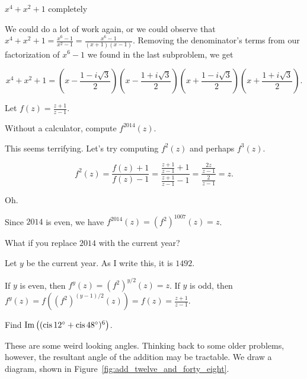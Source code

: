 \documentclass[../key.tex]{subfiles}
\begin{document}
\begin{inner_problem}
\item $x^4+x^2+1$ completely
\end{inner_problem}

We could do a lot of work again, or we could observe that $x^4+x^2+1 = \frac{x^6 - 1}{x^2 - 1} = \frac{x^6 - 1}{(x+1)(x-1)}$. Removing the denominator's terms from our factorization of $x^6-1$ we found in the last subproblem, we get

$$x^4+x^2+1 = \left(x - \frac{1 - i\sqrt{3}}{2}\right) \left(x - \frac{1 + i\sqrt{3}}{2}\right)\left(x + \frac{1 - i\sqrt{3}}{2}\right) \left(x + \frac{1 + i\sqrt{3}}{2}\right).$$

\begin{outer_problem}
\item Let $f(z)=\frac{z+1}{z-1}$.
\end{outer_problem}

\begin{inner_problem}[start=1]
\item Without a calculator, compute $f^{2014}(z)$.
\end{inner_problem}

This seems terrifying. Let's try computing $f^2(z)$ and perhaps $f^3(z)$.

$$f^2(z) = \frac{f(z)+1}{f(z)-1} = \frac{\frac{z+1}{z-1}+1}{\frac{z+1}{z-1}-1} = \frac{\frac{2z}{z-1}}{\frac{2}{z-1}} = z.$$

Oh.

Since $2014$ is even, we have $f^{2014}(z) = (f^2)^{1007}(z) = z$.

\begin{inner_problem}
\item What if you replace $2014$ with the current year?
\end{inner_problem}

Let $y$ be the current year. As I write this, it is $1492$.

If $y$ is even, then $f^y(z) = (f^2)^{y/2}(z) = z$. If $y$ is odd, then $f^y(z) = f((f^2)^{(y-1)/2}(z)) = f(z) = \frac{z+1}{z-1}$.

\begin{outer_problem}
\item Find $\operatorname{Im}\left((\operatorname{cis} 12^\circ + \operatorname{cis} 48^\circ)^6\right)$.
\end{outer_problem}

These are some weird looking angles. Thinking back to some older problems, however, the resultant angle of the addition may be tractable. We draw a diagram, shown in Figure~\ref{fig:add_twelve_and_forty_eight}.
\end{document}
